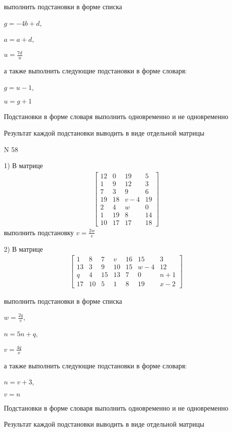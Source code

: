 \documentclass[11pt]{report}
\begin{document}
выполнить подстановки в форме списка

$g=- 4 b + d$,

$a=a + d$,

$u=\frac{7 d}{u}$

а также выполнить следующие подстановки в форме словаря:

$g=u - 1$,

$u=g + 1$


    Подстановки в форме словаря выполнить одновременно и не одновременно


    Результат каждой подстановки выводить в виде отдельной матрицы

\newpage
N 58


    1) В матрице
\begin{align*}
\left[\begin{matrix}12 & 0 & 19 & 5\\1 & 9 & 12 & 3\\7 & 3 & 9 & 6\\19 & 18 & v - 4 & 19\\2 & 4 & w & 0\\1 & 19 & 8 & 14\\10 & 17 & 17 & 18\end{matrix}\right]
\end{align*}
выполнить подстановку $v=\frac{2 w}{v}$


    2) В матрице
\begin{align*}
\left[\begin{matrix}1 & 8 & 7 & v & 16 & 15 & 3\\13 & 3 & 9 & 10 & 15 & w - 4 & 12\\q & 4 & 15 & 13 & 7 & 0 & n + 1\\17 & 10 & 5 & 1 & 8 & 19 & x - 2\end{matrix}\right]
\end{align*}

выполнить подстановки в форме списка

$w=\frac{2 q}{v}$,

$n=5 n + q$,

$v=\frac{4 q}{x}$

а также выполнить следующие подстановки в форме словаря:

$n=v + 3$,

$v=n$


    Подстановки в форме словаря выполнить одновременно и не одновременно


    Результат каждой подстановки выводить в виде отдельной матрицы
\end{document}
